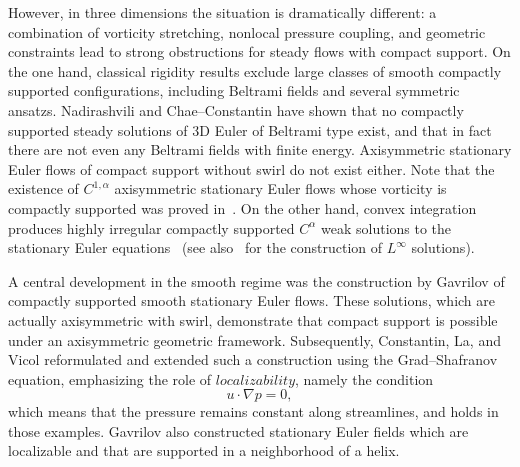 \documentclass[12pt,reqno]{amsart}
\numberwithin{equation}{section}
\theoremstyle{definition}
\theoremstyle{remark}
\begin{document}
However, in three dimensions the situation is dramatically different: a combination of vorticity stretching, nonlocal pressure coupling, and geometric constraints lead to strong obstructions for  steady flows with compact support. On the one hand, classical rigidity results exclude large classes of smooth compactly supported configurations, including Beltrami fields and several symmetric ansatzs. Nadirashvili \cite{Nadirashvili} and Chae–Constantin \cite{ChaeConstantin} have shown that no compactly supported steady solutions of 3D Euler of Beltrami type exist, and that in fact there are not even any Beltrami fields with finite energy. Axisymmetric stationary Euler flows of compact support without swirl do not exist \cite{JiuXin} either. Note that the existence of $ C^{1, \alpha}  $ axisymmetric stationary Euler flows whose vorticity is compactly supported was proved in~\cite{FraenkelBerger}. On the other hand, convex integration produces highly irregular compactly supported $C^\alpha$ weak solutions to the stationary Euler equations~\cite{EPP25}  (see also~\cite{ChoffrutSzekelyhidi} for the construction of $ L^\infty $ solutions).

A central development in the smooth regime was the construction by Gavrilov \cite{Gavrilov} of compactly supported smooth stationary Euler flows. %
These solutions, which are actually axisymmetric with swirl, demonstrate that compact support is possible under an axisymmetric geometric framework. Subsequently, Constantin, La, and Vicol \cite{ConstantinLaVicol} reformulated and extended such a construction using the Grad–Shafranov equation, emphasizing the role of $ localizability $, namely the condition
\begin{equation*} 
u\cdot\nabla p=0,
\end{equation*}
which means that the pressure remains
constant along streamlines, and holds in those examples. Gavrilov also constructed \cite{GavrilovHelical} stationary Euler fields which are localizable and that are supported in a neighborhood of a helix.
\end{document}

